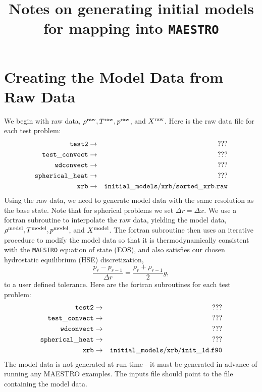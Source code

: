 \documentclass[11pt]{article}
\title{Notes on generating initial models for mapping into {\tt MAESTRO}}
\def\model {\rm model}
\def\raw   {\rm raw}
\begin{document}
\maketitle
\tableofcontents

\clearpage

\section{Creating the Model Data from Raw Data}
We begin with raw data, $\rho^{\raw}, T^{\raw}, p^{\raw}$, and $X^{\raw}$.  Here is the raw data file for each test problem:
\begin{eqnarray}
{\tt test2} & \rightarrow & {\tt ???} \nonumber \\
{\tt test\_convect} & \rightarrow & {\tt ???} \nonumber \\
{\tt wdconvect} & \rightarrow & {\tt ???} \nonumber \\
{\tt spherical\_heat} & \rightarrow & {\tt ???} \nonumber \\
{\tt xrb} & \rightarrow & {\tt initial\_models/xrb/sorted\_xrb.raw} \nonumber
\end{eqnarray}
Using the raw data, we need to generate model data with the same resolution as the base state.  Note that for spherical problems we set $\Delta r = \Delta x$.  We use a fortran subroutine to interpolate the raw data, yielding the model data, $\rho^{\model}, T^{\model}, p^{\model}$, and $X^{\model}$.  The fortran subroutine then uses an iterative procedure to modify the model data so that it is thermodynamically consistent with the {\tt MAESTRO} equation of state (EOS), and also satisfies our chosen hydrostatic equilibrium (HSE) discretization,
\begin{equation}
\frac{p_r - p_{r-1}}{\Delta r} = \frac{\rho_r + \rho_{r-1}}{2}g,\label{HSE Discretization}
\end{equation}
to a user defined tolerance.  Here are the fortran subroutines for each test problem:
\begin{eqnarray}
{\tt test2} & \rightarrow & {\tt ???} \nonumber \\
{\tt test\_convect} & \rightarrow & {\tt ???} \nonumber \\
{\tt wdconvect} & \rightarrow & {\tt ???} \nonumber \\
{\tt spherical\_heat} & \rightarrow & {\tt ???} \nonumber \\
{\tt xrb} & \rightarrow & {\tt initial\_models/xrb/init\_1d.f90} \nonumber
\end{eqnarray}
The model data is not generated at run-time - it must be generated in advance of running any MAESTRO examples.  The inputs file should point to the file containing the model data.
\end{document}
